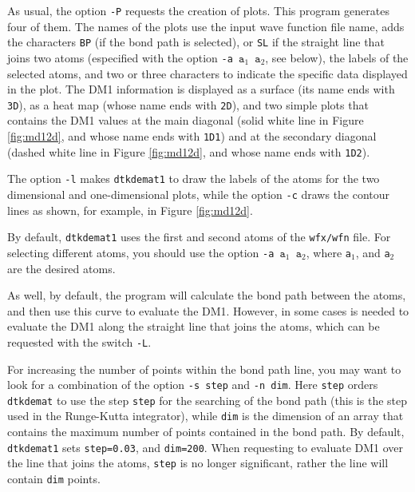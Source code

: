 As usual, the option \texttt{-P} requests the creation of plots. This program generates four of them. The names of the plots use the input wave function file name, adds the characters \texttt{BP} (if the bond path is selected), or \texttt{SL} if the straight line that joins two atoms (especified with the option \texttt{-a $\mathtt{a}_1$ $\mathtt{a}_2$}, see below), the labels of the selected atoms, and two or three characters to indicate the specific data displayed in the plot. The DM1 information is displayed as a surface (its name ends with \texttt{3D}), as a heat map (whose name ends with \texttt{2D}), and two simple plots that contains the DM1 values at the main diagonal (solid white line in Figure \ref{fig:md12d}, and whose name ends with \texttt{1D1}) and at the secondary diagonal (dashed white line in Figure \ref{fig:md12d}, and whose name ends with \texttt{1D2}).

The option \texttt{-l} makes \texttt{dtkdemat1} to draw the labels of the atoms for the two dimensional and one-dimensional plots, while the option \texttt{-c} draws the contour lines as shown, for example, in Figure \ref{fig:md12d}.

By default, \texttt{dtkdemat1} uses the first and second atoms of the \texttt{wfx/wfn} file. For selecting different atoms, you should use the option \texttt{-a $\mathtt{a}_1$ $\mathtt{a}_2$}, where \texttt{a}$_1$, and \texttt{a}$_2$ are the desired atoms.

As well, by default, the program will calculate the bond path between the atoms, and then use this curve to evaluate the DM1. However, in some cases is needed to evaluate the DM1 along the straight line that joins the atoms, which can be requested with the switch \texttt{-L}.

For increasing the number of points within the bond path line, you may want to look for a combination of the option \texttt{-s step} and \texttt{-n dim}. Here \texttt{step} orders \texttt{dtkdemat} to use the step \texttt{step} for the searching of the bond path (this is the step used in the Runge-Kutta integrator), while \texttt{dim} is the dimension of an array that contains the maximum number of points contained in the bond path. By default, \texttt{dtkdemat1} sets \texttt{step=0.03}, and \texttt{dim=200}. When requesting to evaluate DM1 over the line that joins the atoms, \texttt{step} is no longer significant, rather the line will contain \texttt{dim} points. 


